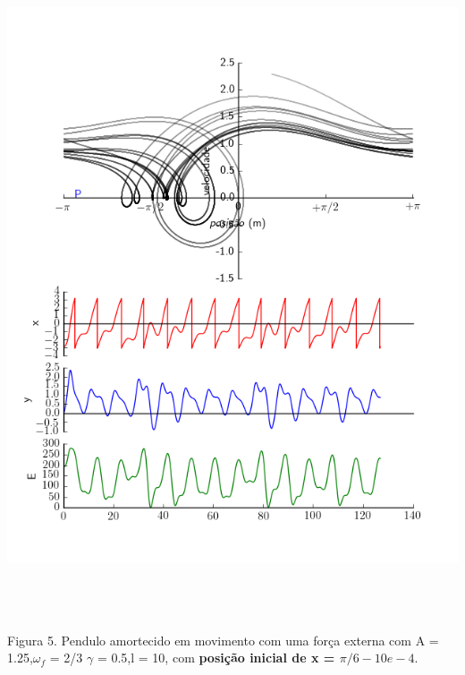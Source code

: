 \documentclass[dvipsnames,a4paper,11pt]{article}
\begin{document}
\begin{center}
	\includegraphics[width=6.24in,height=7.68in,keepaspectratio = false]{image6.png}
	
	\scriptsize Figura 5. Pendulo amortecido em movimento com uma força externa com A = 1.25,$\omega_f$ = 2/3 $\gamma$ = 0.5,l = 10, com \textbf{posição inicial de x = $\pi/6 - 10e-4$}. 
	
\end{center}
\end{document}
